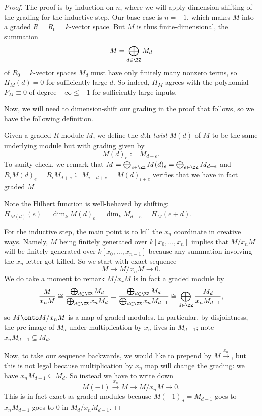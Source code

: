 \begin{proof}
	The proof is by induction on $n$, where we will apply dimension-shifting of the grading for the inductive step. Our base case is $n=-1$, which makes $M$ into a graded $R=R_0=k$-vector space. But $M$ is thus finite-dimensional, the summation
	\[M=\bigoplus_{d\in\ZZ}M_d\]
	of $R_0=k$-vector spaces $M_d$ must have only finitely many nonzero terms, so $H_M(d)=0$ for sufficiently large $d$. So indeed, $H_M$ agrees with the polynomial $P_M\equiv0$ of degree $-\infty\le-1$ for sufficiently large inputs.

	Now, we will need to dimension-shift our grading in the proof that follows, so we have the following definition.
	\begin{definition}[Twist]
		Given a graded $R$-module $M$, we define the $d$th \textit{twist} $M(d)$ of $M$ to be the same underlying module but with grading given by
		\[M(d)_e:=M_{d+e}.\]
		To sanity check, we remark that $M=\bigoplus_{e\in\ZZ}M(d)_e=\bigoplus_{e\in\ZZ}M_{d+e}$ and $R_iM(d)_e=R_iM_{d+e}\subseteq M_{i+d+e}=M(d)_{i+e}$ verifies that we have in fact graded $M$.
	\end{definition}
	Note the Hilbert function is well-behaved by shifting: $H_{M(d)}(e)=\dim_kM(d)_e=\dim_kM_{d+e}=H_M(e+d)$.

	For the inductive step, the main point is to kill the $x_n$ coordinate in creative ways. Namely, $M$ being finitely generated over $k[x_0,\ldots,x_n]$ implies that $M/x_nM$ will be finitely generated over $k[x_0,\ldots,x_{n-1}]$ because any summation involving the $x_n$ letter got killed. So we start with exact sequence
	\[M\to M/x_nM\to 0.\]
	We do take a moment to remark $M/x_rM$ is in fact a graded module by
	\[\frac M{x_nM}\cong\frac{\bigoplus_{d\in\ZZ}M_d}{\bigoplus_{d\in\ZZ}x_nM_d}=\frac{\bigoplus_{d\in\ZZ}M_d}{\bigoplus_{d\in\ZZ}x_nM_{d-1}}\cong\bigoplus_{d\in\ZZ}\frac{M_d}{x_nM_{d-1}},\]
	so $M\onto M/x_nM$ is a map of graded modules. In particular, by disjointness, the pre-image of $M_d$ under multiplication by $x_n$ lives in $M_{d-1}$; note $x_nM_{d-1}\subseteq M_d$.
	
	Now, to take our sequence backwards, we would like to prepend by $M\stackrel{x_n}\to$, but this is not legal because multiplication by $x_n$ map will change the grading: we have $x_nM_{d-1}\subseteq M_d$. So instead we have to write down
	\[M(-1)\stackrel{x_n}\to M\to M/x_nM\to 0.\]
	This is in fact exact as graded modules because $M(-1)_d=M_{d-1}$ goes to $x_nM_{d-1}$ goes to $0$ in $M_d/x_nM_{d-1}$.
	

\end{proof}
